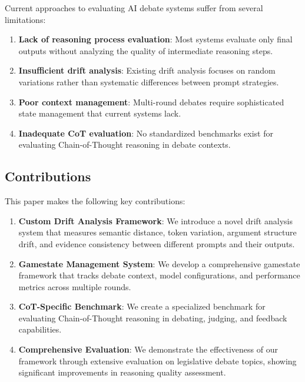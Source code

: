 \documentclass[11pt]{article}
\begin{document}
Current approaches to evaluating AI debate systems suffer from several limitations:

\begin{enumerate}
    \item \textbf{Lack of reasoning process evaluation}: Most systems evaluate only final outputs without analyzing the quality of intermediate reasoning steps.
    \item \textbf{Insufficient drift analysis}: Existing drift analysis focuses on random variations rather than systematic differences between prompt strategies.
    \item \textbf{Poor context management}: Multi-round debates require sophisticated state management that current systems lack.
    \item \textbf{Inadequate CoT evaluation}: No standardized benchmarks exist for evaluating Chain-of-Thought reasoning in debate contexts.
\end{enumerate}

\subsection{Contributions}

This paper makes the following key contributions:

\begin{enumerate}
    \item \textbf{Custom Drift Analysis Framework}: We introduce a novel drift analysis system that measures semantic distance, token variation, argument structure drift, and evidence consistency between different prompts and their outputs.
    
    \item \textbf{Gamestate Management System}: We develop a comprehensive gamestate framework that tracks debate context, model configurations, and performance metrics across multiple rounds.
    
    \item \textbf{CoT-Specific Benchmark}: We create a specialized benchmark for evaluating Chain-of-Thought reasoning in debating, judging, and feedback capabilities.
    
    \item \textbf{Comprehensive Evaluation}: We demonstrate the effectiveness of our framework through extensive evaluation on legislative debate topics, showing significant improvements in reasoning quality assessment.
\end{enumerate}
\end{document}
